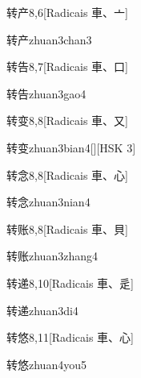 \begin{entry}{转产}{8,6}[Radicais ⾞、⼇]
  \begin{phonetics}{转产}{zhuan3chan3}
  \end{phonetics}
\end{entry}

\begin{entry}{转告}{8,7}[Radicais ⾞、⼝]
  \begin{phonetics}{转告}{zhuan3gao4}
  \end{phonetics}
\end{entry}

\begin{entry}{转变}{8,8}[Radicais ⾞、⼜]
  \begin{phonetics}{转变}{zhuan3bian4}[][HSK 3]
  \end{phonetics}
\end{entry}

\begin{entry}{转念}{8,8}[Radicais ⾞、⼼]
  \begin{phonetics}{转念}{zhuan3nian4}
  \end{phonetics}
\end{entry}

\begin{entry}{转账}{8,8}[Radicais ⾞、⾙]
  \begin{phonetics}{转账}{zhuan3zhang4}
  \end{phonetics}
\end{entry}

\begin{entry}{转递}{8,10}[Radicais ⾞、⾡]
  \begin{phonetics}{转递}{zhuan3di4}
  \end{phonetics}
\end{entry}

\begin{entry}{转悠}{8,11}[Radicais ⾞、⼼]
  \begin{phonetics}{转悠}{zhuan4you5}
  \end{phonetics}
\end{entry}

